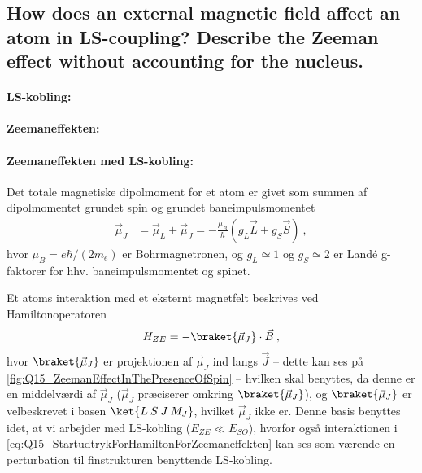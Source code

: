 \subsection{How does an external magnetic field affect an atom in LS-coupling? Describe the Zeeman effect without accounting for the nucleus.}


\paragraph{LS-kobling:}


\paragraph{Zeemaneffekten:}


\paragraph{Zeemaneffekten med LS-kobling:} Det totale magnetiske dipolmoment for et atom er givet som summen af dipolmomentet grundet spin og grundet baneimpulsmomentet
\begin{align}
    \Vec{\mu}_J &= \Vec{\mu}_L + \Vec{\mu}_J = - \frac{\mu_B}{\hbar} \left( g_L \Vec{L} + g_S \Vec{S} \right) \: ,
\end{align}
hvor $\mu_B = e\hbar/(2m_e)$ er Bohrmagnetronen, og $g_L \simeq 1$ og $g_S \simeq 2$ er Landé g-faktorer for hhv. baneimpulsmomentet og spinet.

Et atoms interaktion med et eksternt magnetfelt beskrives ved Hamiltonoperatoren
\begin{align} \label{eq:Q15_StartudtrykForHamiltonForZeemaneffekten}
    H_{ZE} = -\braket{\Vec{\mu}_J} \cdot \Vec{B} \: ,
\end{align}
hvor $\braket{\Vec{\mu}_J}$ er projektionen af $\Vec{\mu}_J$ ind langs $\Vec{J}$ -- dette kan ses på \cref{fig:Q15_ZeemanEffectInThePresenceOfSpin}
-- hvilken skal benyttes, da denne er en middelværdi af $\Vec{\mu}_J$ ($\Vec{\mu}_J$ præciserer omkring $\braket{\Vec{\mu}_J}$), og $\braket{\Vec{\mu}_J}$ er velbeskrevet i basen $\ket{L \: S \: J \: M_J}$, hvilket $\Vec{\mu}_J$ ikke er. Denne basis benyttes idet, at vi arbejder med LS-kobling ($E_{ZE} \ll E_{SO}$), hvorfor også interaktionen i \cref{eq:Q15_StartudtrykForHamiltonForZeemaneffekten} kan ses som værende en perturbation til finstrukturen benyttende LS-kobling.

